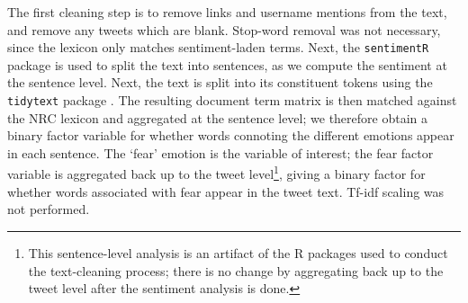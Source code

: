 \documentclass{article}
\begin{document}
The first cleaning step is to remove links and username mentions from the text, and remove any tweets which are blank. Stop-word removal was not necessary, since the lexicon only matches sentiment-laden terms. Next, the \texttt{sentimentR} package \parencite{rinkerSentimentr2018} is used to split the text into sentences, as we compute the sentiment at the sentence level. Next, the text is split into its constituent tokens using the \texttt{tidytext} package \parencite{silgeTextMiningTidy2017}. The resulting document term matrix is then matched against the NRC lexicon and aggregated at the sentence level; we therefore obtain a binary factor variable for whether words connoting the different emotions appear in each sentence. The `fear' emotion is the variable of interest; the fear factor variable is aggregated back up to the tweet level\footnote{This sentence-level analysis is an artifact of the R packages used to conduct the text-cleaning process; there is no change by aggregating back up to the tweet level after the sentiment analysis is done.}, giving a binary factor for whether words associated with fear appear in the tweet text.  Tf-idf scaling was not performed.
\end{document}
